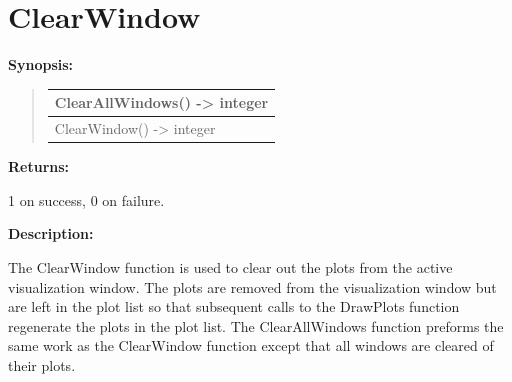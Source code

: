 \documentclass[letterpaper,10pt,english]{sphinxmanual}
\begin{document}
\section{ClearWindow}
\label{functions:clearwindow}
\begin{DUlineblock}{0em}
\item[] \textbf{Synopsis:}
\end{DUlineblock}
\begin{quote}

\begin{tabulary}{\linewidth}{|L|}
\hline

ClearAllWindows() -\textgreater{} integer
\\
\hline
ClearWindow() -\textgreater{} integer
\\
\hline\end{tabulary}

\end{quote}

\begin{DUlineblock}{0em}
\item[] 
\item[] \textbf{Returns:}
\item[] 1 on success, 0 on failure.
\item[] 
\item[] \textbf{Description:}
\item[] The ClearWindow function is used to clear out the plots from the active
visualization window. The plots are removed from the visualization window
but are left in the plot list so that subsequent calls to the DrawPlots
function regenerate the plots in the plot list. The ClearAllWindows
function preforms the same work as the ClearWindow function except that all
windows are cleared of their plots.
\end{DUlineblock}

\begin{DUlineblock}{0em}
\item[] 
\end{DUlineblock}
\end{document}
